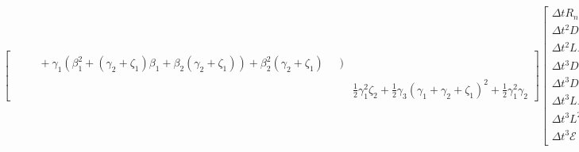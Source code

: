 \documentclass[letterpaper,11pt]{amsart}
\newcommand{\order}[2]{\ensuremath{O\!\left( {#1}^{#2} \right)}}
\begin{document}
\begin{align}
{\begin{bmatrix}
\begin{split}
  &\quad+ \gamma_{1} \left(
      \beta_{1}^{2}
      + \left( \gamma_{2} + \zeta_{1} \right)\beta_{1}
      + \beta_{2} \left( \gamma_{2} + \zeta_{1} \right)
    \right)
  + \beta_{2}^{2} \left( \gamma_{2} + \zeta_{1} \right)
\end{split}
\mspace{18mu}\Bigg)
  \\
%
  &\frac{1}{2}\gamma_{1}^{2}\zeta_{2}
  + \frac{1}{2}\gamma_{3}\left( \gamma_{1}+\gamma_{2}+\zeta_{1} \right)^{2}
  + \frac{1}{2} \gamma_{1}^{2} \gamma_{2}
\end{bmatrix}}
\begin{bmatrix}
  \Delta{}t R_{n} \\
  \Delta{}t^{2} D R_{n} \\
  \Delta{}t^{2} L R_{n} \\
  \Delta{}t^{3} D^{2} R_{n} \\
  \Delta{}t^{3} D L R_{n} \\
  \Delta{}t^{3} L D R_{n} \\
  \Delta{}t^{3} L^{2} R_{n} \\
  \Delta{}t^{3} \mathcal{E}\left( R_{n}, R_{n} \right)
\end{bmatrix}
  + \order{\Delta{}t}{4}
\end{align}
\end{document}
